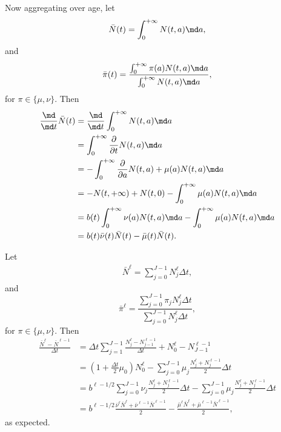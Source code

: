 \documentclass{jpmarticle}
\begin{document}
Now aggregating over age, let
\begin{equation}
  \bar{N}(t)
  = \int_0^{+\infty} N(t, a) \md a,
\end{equation}
and
\begin{equation}
  \bar{\pi}(t)
  = \frac{\int_0^{+\infty} \pi(a) N(t, a) \md a}
  {\int_0^{+\infty} N(t, a) \md a},
\end{equation}
for $\pi \in \{\mu, \nu\}$. Then
\begin{equation}
  \begin{split}
    \frac{\md}{\md t} \bar{N}(t)
    &= \frac{\md}{\md t}
    \int_0^{+\infty} N(t, a) \md a
    \\
    &= \int_0^{+\infty} \frac{\partial}{\partial t} N(t, a) \md a
    \\
    &= - \int_0^{+\infty} \frac{\partial}{\partial a} N(t, a)
    + \mu(a) N(t, a) \md a
    \\
    &= - N(t, +\infty) + N(t, 0)
    - \int_0^{+\infty} \mu(a) N(t, a) \md a
    \\
    &= b(t) \int_0^{+\infty} \nu(a) N(t, a) \md a
    - \int_0^{+\infty} \mu(a) N(t, a) \md a
    \\
    &= b(t) \bar{\nu}(t) \bar{N}(t)
    - \bar{\mu}(t) \bar{N}(t).
  \end{split}
\end{equation}

Let
\begin{align}
  \bar{N}^{\ell}
  = \sum_{j = 0}^{J - 1} N_j^{\ell} \Delta t,
\end{align}
and
\begin{equation}
  \bar{\pi}^{\ell}
  = \frac{\sum_{j = 0}^{J - 1} \pi_j N_j^{\ell} \Delta t}
  {\sum_{j = 0}^{J - 1} N_j^{\ell} \Delta t},
\end{equation}
for $\pi \in \{\mu, \nu\}$. Then
\begin{equation}
  \begin{split}
    \frac{\bar{N}^{\ell} - \bar{N}^{\ell - 1}}{\Delta t}
    &= \Delta t \sum_{j = 1}^{J - 1}
    \frac{N_j^{\ell} - N_{j - 1}^{\ell - 1}}{\Delta t}
    + N_0^{\ell} - N_{J - 1}^{\ell - 1}
    \\
    &= \left(1 + \frac{\Delta t}{2} \mu_0\right) N_0^{\ell}
    - \sum_{j = 0}^{J - 1} \mu_j
    \frac{N_j^{\ell} + N_j^{\ell - 1}}{2} \Delta t
    \\
    &= b^{\ell - 1 / 2} \sum_{j = 0}^{J - 1} \nu_j
    \frac{N_j^{\ell} + N_j^{\ell - 1}}{2}
    \Delta t
    - \sum_{j = 0}^{J - 1} \mu_j
    \frac{N_j^{\ell} + N_j^{\ell - 1}}{2}
    \Delta t
    \\
    &= b^{\ell - 1 / 2}
    \frac{\bar{\nu}^{\ell} \bar{N}^{\ell}
      + \bar{\nu}^{\ell - 1} \bar{N}^{\ell - 1}}{2}
    - \frac{\bar{\mu}^{\ell} \bar{N}^{\ell}
      + \bar{\mu}^{\ell - 1} \bar{N}^{\ell - 1}}{2},
  \end{split}
\end{equation}
as expected.
\end{document}
